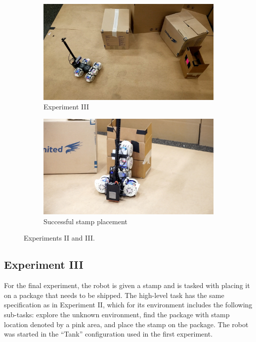 \documentclass[conference]{IEEEtran}
\begin{document}
\begin{figure}[t]
    \begin{subfigure}[t]{0.24\textwidth}
        \includegraphics[width=\textwidth]{images/stamp_explore_overhead.jpg}
        \caption{Experiment III}
    \end{subfigure}
    \begin{subfigure}[t]{0.24\textwidth}
        \includegraphics[width=\textwidth]{images/stamp_placing.jpg}
        \caption{Successful stamp placement}
    \end{subfigure}
      \caption{Experiments II and III.}
      \label{fig:exps}
   \end{figure}

\subsection{Experiment III}

For the final experiment, the robot is given a stamp and is tasked with placing it on a package that needs to be shipped. The high-level task has the same specification as in Experiment II, which for its environment includes the following sub-tasks: explore the unknown environment, find the package with stamp location denoted by a pink area, and place the stamp on the package. The robot was started in the ``Tank'' configuration used in the first experiment.
\end{document}
